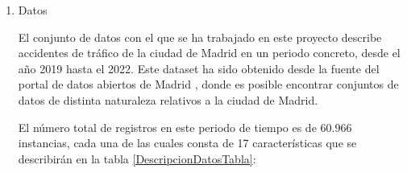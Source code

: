     \begin{enumerate}

        \item Datos

            El conjunto de datos con el que se ha trabajado en este proyecto describe accidentes de tráfico de la ciudad de Madrid en un periodo concreto, desde el año 2019 hasta el 2022. Este dataset ha sido obtenido desde la fuente del portal de datos abiertos de Madrid \cite{DatasetMadrid}, donde es posible encontrar conjuntos de datos de distinta naturaleza relativos a la ciudad de Madrid.

            El número total de registros en este periodo de tiempo es de 60.966 instancias, cada una de las cuales consta de 17 características que se describirán en la tabla \ref{DescripcionDatosTabla}:


\end{enumerate}
